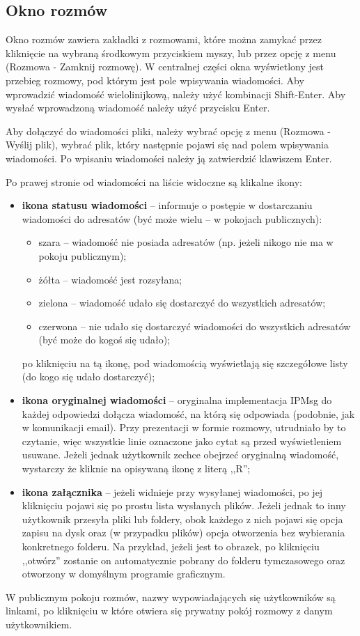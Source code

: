 \documentclass[11pt,leqno]{article}
\begin{document}
\subsection{Okno rozmów}

Okno rozmów zawiera zakładki z rozmowami, które można zamykać przez kliknięcie na wybraną środkowym
przyciskiem myszy, lub przez opcję z menu (Rozmowa - Zamknij rozmowę). W centralnej części okna
wyświetlony jest przebieg rozmowy, pod którym jest pole wpisywania wiadomości. Aby wprowadzić
wiadomość wielolinijkową, należy użyć kombinacji Shift-Enter. Aby wysłać wprowadzoną wiadomość należy
użyć przycisku Enter.

Aby dołączyć do wiadomości pliki, należy wybrać opcję z menu (Rozmowa - Wyślij plik), wybrać plik,
który następnie pojawi się nad polem wpisywania wiadomości. Po wpisaniu wiadomości należy ją
zatwierdzić klawiszem Enter.

Po prawej stronie od wiadomości na liście widoczne są klikalne ikony:
\begin{itemize}
	\item \textbf{ikona statusu wiadomości} -- informuje o postępie w dostarczaniu wiadomości
	do adresatów (być może wielu -- w pokojach publicznych):
	\begin{itemize}
		\item szara -- wiadomość nie posiada adresatów (np. jeżeli nikogo nie ma w pokoju publicznym);
		\item żółta -- wiadomość jest rozsyłana;
		\item zielona -- wiadomość udało się dostarczyć do wszystkich adresatów;
		\item czerwona -- nie udało się dostarczyć wiadomości do wszystkich adresatów (być może
		do kogoś się udało);
	\end{itemize}
	po kliknięciu na tą ikonę, pod wiadomością wyświetlają się szczegółowe listy (do kogo się udało
	dostarczyć);
	\item \textbf{ikona oryginalnej wiadomości} -- oryginalna implementacja IPMsg do każdej odpowiedzi
	dołącza wiadomość, na którą się odpowiada (podobnie, jak w komunikacji email). Przy prezentacji
	w formie rozmowy, utrudniało by to czytanie, więc wszystkie linie oznaczone jako cytat są
	przed wyświetleniem usuwane. Jeżeli jednak użytkownik zechce obejrzeć oryginalną wiadomość,
	wystarczy że kliknie na opisywaną ikonę z literą ,,R'';
	\item \textbf{ikona załącznika} -- jeżeli widnieje przy wysyłanej wiadomości, po jej kliknięciu
	pojawi się po prostu lista wysłanych plików. Jeżeli jednak to inny użytkownik przesyła pliki lub
	foldery, obok każdego z nich pojawi się opcja zapisu na dysk oraz (w przypadku plików) opcja
	otworzenia bez wybierania konkretnego folderu. Na przykład, jeżeli jest to obrazek, po kliknięciu
	,,otwórz'' zostanie on automatycznie pobrany do folderu tymczasowego oraz otworzony w domyślnym
	programie graficznym.
\end{itemize}

W publicznym pokoju rozmów, nazwy wypowiadających się użytkowników są linkami, po kliknięciu w które
otwiera się prywatny pokój rozmowy z danym użytkownikiem.
\end{document}
